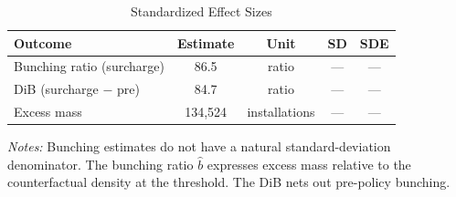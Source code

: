 \begin{table}[t]
\centering
\caption{Standardized Effect Sizes}
\label{tab:sde}
\begin{tabular}{lcccc}
\toprule
Outcome & Estimate & Unit & SD & SDE \\
\midrule
Bunching ratio (surcharge) & 86.5 & ratio & --- & --- \\
DiB (surcharge $-$ pre) & 84.7 & ratio & --- & --- \\
Excess mass & 134,524 & installations & --- & --- \\
\bottomrule
\end{tabular}
\begin{flushleft}\small \textit{Notes:} Bunching estimates do not have a natural standard-deviation denominator. The bunching ratio $\hat{b}$ expresses excess mass relative to the counterfactual density at the threshold. The DiB nets out pre-policy bunching.\end{flushleft}
\end{table}

